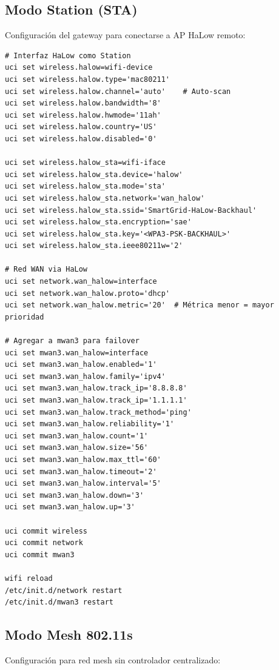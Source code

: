 \subsection{Modo Station (STA)}

Configuración del gateway para conectarse a AP HaLow remoto:

\begin{verbatim}
# Interfaz HaLow como Station
uci set wireless.halow=wifi-device
uci set wireless.halow.type='mac80211'
uci set wireless.halow.channel='auto'    # Auto-scan
uci set wireless.halow.bandwidth='8'
uci set wireless.halow.hwmode='11ah'
uci set wireless.halow.country='US'
uci set wireless.halow.disabled='0'

uci set wireless.halow_sta=wifi-iface
uci set wireless.halow_sta.device='halow'
uci set wireless.halow_sta.mode='sta'
uci set wireless.halow_sta.network='wan_halow'
uci set wireless.halow_sta.ssid='SmartGrid-HaLow-Backhaul'
uci set wireless.halow_sta.encryption='sae'
uci set wireless.halow_sta.key='<WPA3-PSK-BACKHAUL>'
uci set wireless.halow_sta.ieee80211w='2'

# Red WAN via HaLow
uci set network.wan_halow=interface
uci set network.wan_halow.proto='dhcp'
uci set network.wan_halow.metric='20'  # Métrica menor = mayor prioridad

# Agregar a mwan3 para failover
uci set mwan3.wan_halow=interface
uci set mwan3.wan_halow.enabled='1'
uci set mwan3.wan_halow.family='ipv4'
uci set mwan3.wan_halow.track_ip='8.8.8.8'
uci set mwan3.wan_halow.track_ip='1.1.1.1'
uci set mwan3.wan_halow.track_method='ping'
uci set mwan3.wan_halow.reliability='1'
uci set mwan3.wan_halow.count='1'
uci set mwan3.wan_halow.size='56'
uci set mwan3.wan_halow.max_ttl='60'
uci set mwan3.wan_halow.timeout='2'
uci set mwan3.wan_halow.interval='5'
uci set mwan3.wan_halow.down='3'
uci set mwan3.wan_halow.up='3'

uci commit wireless
uci commit network
uci commit mwan3

wifi reload
/etc/init.d/network restart
/etc/init.d/mwan3 restart
\end{verbatim}

\subsection{Modo Mesh 802.11s}

Configuración para red mesh sin controlador centralizado:

